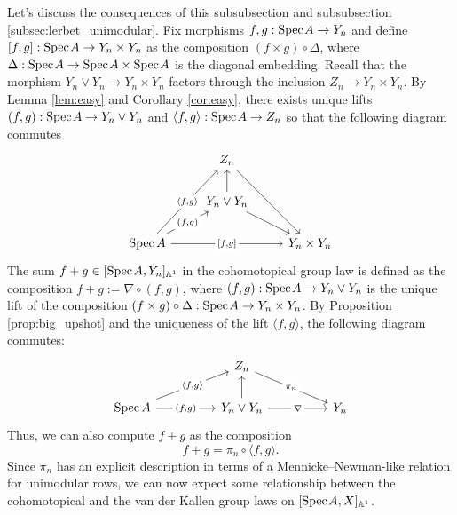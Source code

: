 Let's discuss the consequences of this subsubsection and subsubsection \ref{subsec:lerbet_unimodular}. Fix morphisms $f,g: \text{Spec}\hspace{0.1em} A \to Y_n$ and define $[f,g]: \text{Spec}\hspace{0.1em} A \to Y_n \times Y_n$ as the composition $(f\times g) \circ \Delta$, where $\Delta: \text{Spec}\hspace{0.1em} A \to \text{Spec}\hspace{0.1em} A \times \text{Spec}\hspace{0.1em} A$ is the diagonal embedding. Recall that the morphism $Y_n \vee Y_n \to Y_n \times Y_n$ factors through the inclusion $Z_n \to Y_n \times Y_n$. By Lemma \ref{lem:easy} and Corollary \ref{cor:easy}, there exists unique lifts $(f,g): \text{Spec}\hspace{0.1em} A \to Y_n \vee Y_n$ and $\langle f,g\rangle: \text{Spec}\hspace{0.1em} A \to Z_n$ so that the following diagram commutes
\[\begin{tikzcd}
	& {Z_n} \\
	& {Y_n \vee Y_n} \\
	{\operatorname{Spec}A} && {Y_n \times Y_n}
	\arrow[from=1-2, to=3-3]
	\arrow[from=2-2, to=1-2]
	\arrow[from=2-2, to=3-3]
	\arrow["{{\langle f,g\rangle}}"{description}, from=3-1, to=1-2]
	\arrow["{{(f,g)}}"{description}, from=3-1, to=2-2]
	\arrow["{{[f,g]}}"{description}, from=3-1, to=3-3]
\end{tikzcd}\]
The sum $f + g \in [\text{Spec}\hspace{0.1em} A,Y_n]_{\mathbb{A}^1}$ in the cohomotopical group law is defined as the composition $f+g := \nabla \circ (f,g)$, where $(f,g): \text{Spec}\hspace{0.1em} A \to Y_n \vee Y_n$ is the unique lift of the composition $(f \times g) \circ \Delta: \text{Spec}\hspace{0.1em} A \to Y_n \times Y_n$. By Proposition \ref{prop:big_upshot} and the uniqueness of the lift $\langle f,g\rangle$, the following diagram commutes:
\[\begin{tikzcd}
	&& {Z_n} \\
	{\operatorname{Spec}A} && {Y_n \vee Y_n} && {Y_n}
	\arrow["{\pi_n}"{description}, from=1-3, to=2-5]
	\arrow["{\langle f,g\rangle}"{description}, from=2-1, to=1-3]
	\arrow["{(f,g)}"{description}, from=2-1, to=2-3]
	\arrow[from=2-3, to=1-3]
	\arrow["\nabla"{description}, from=2-3, to=2-5]
\end{tikzcd}\]
Thus, we can also compute $f + g$ as the composition \[f + g = \pi_n \circ \langle f,g \rangle.\] Since $\pi_n$ has an explicit description in terms of a Mennicke--Newman-like relation for unimodular rows, we can now expect some relationship between the cohomotopical and the van der Kallen group laws on $[\text{Spec}\hspace{0.1em} A, X]_{\mathbb{A}^1}$.

